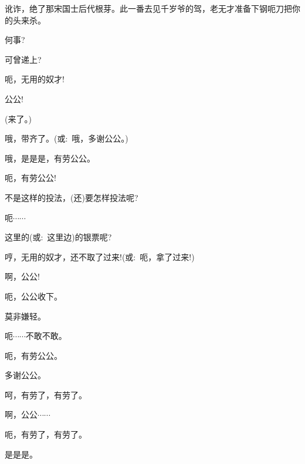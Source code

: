{讹诈，绝了那宋国士后代根芽。此一番去见千岁爷的驾，老无才准备下钢{呃}刀把你的头来杀。

{\vspace{5pt}}

{何事?}\hspace{40pt}~

{可曾递上?}\hspace{30pt}~

{呃，无用的奴才!}\hspace{20pt}~

{公公!}\hspace{40pt}~

{(来了。)}\hspace{30pt}~

{哦，带齐了。({\akai 或}:~哦，多谢公公。)}

{哦，是是是，有劳公公。}\hspace{10pt}~

{呃，有劳公公!}\hspace{20pt}~

{不是这样的投法，(还)要怎样投法呢?}

{呃$\cdots{}\cdots{}$}

{这里的({\akai 或}:~这里边)的银票呢?}

{哼，无用的奴才，还不取了过来!({\akai 或}:~呃，拿了过来!)}

{啊，公公!}\hspace{30pt}~

{呃，公公收下。}\hspace{20pt}~

{莫非嫌轻。}\hspace{30pt}~

{呃$\cdots{}\cdots{}$不敢不敢。}

{呃，有劳公公。}\hspace{20pt}~

{多谢公公。}\hspace{30pt}~

{呵，有劳了，有劳了。}\hspace{10pt}~

{啊，公公$\cdots{}\cdots{}$}

{呃，有劳了，有劳了。}\hspace{10pt}~

{是是是。}\hspace{30pt}~

}
